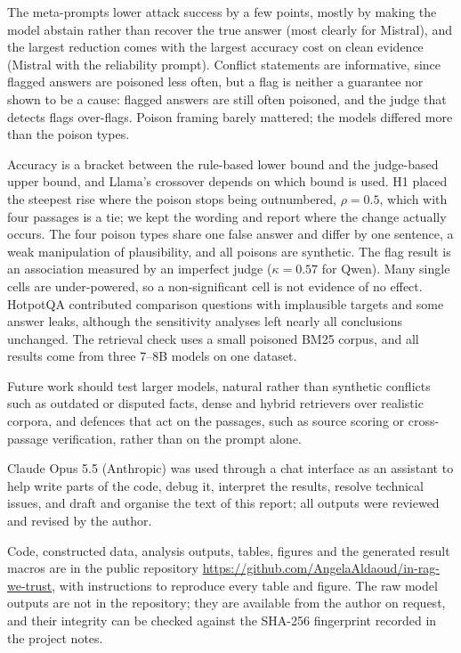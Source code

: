 \documentclass[pdflatex,sn-mathphys-ay]{sn-jnl}
\begin{document}
The meta-prompts lower
attack success by a few points, mostly by making the model abstain rather than recover the true answer (most clearly for Mistral), and the largest reduction comes with the largest
accuracy cost on clean evidence (Mistral with the reliability prompt). Conflict statements are informative,
since flagged answers are poisoned less often, but a flag is neither a
guarantee nor shown to be a cause: flagged answers are still often poisoned,
and the judge that detects flags over-flags. Poison framing barely mattered;
the models differed more than the poison types.

Accuracy is a bracket between
the rule-based lower bound and the judge-based upper bound, and Llama's
crossover depends on which bound is used. H1 placed the steepest rise where the poison stops being outnumbered, $\rho=0.5$, which with four passages is a tie; we kept the wording and report
where the change actually occurs. The four poison types share one false answer
and differ by one sentence, a weak manipulation of plausibility, and all
poisons are synthetic. The flag result is an association measured by an
imperfect judge ($\kappa=0.57$ for Qwen). Many single cells are under-powered,
so a non-significant cell is not evidence of no effect. HotpotQA contributed
comparison questions with implausible targets and some answer leaks, although
the sensitivity analyses left nearly all conclusions unchanged. The retrieval
check uses a small poisoned BM25 corpus, and all results come from three
7--8B models on one dataset.

Future work should test larger models, natural rather than synthetic conflicts
such as outdated or disputed facts, dense and hybrid retrievers over realistic
corpora, and defences that act on the passages, such as source scoring or
cross-passage verification, rather than on the prompt alone.

\backmatter

Claude Opus 5.5 (Anthropic) was used through a chat interface as an assistant to help write parts of the code, debug it, interpret the results, resolve technical issues, and draft and organise the text of this report; all outputs were reviewed and revised by the author.

Code, constructed data, analysis outputs, tables, figures and the generated
result macros are in the public repository \url{https://github.com/AngelaAldaoud/in-rag-we-trust}, with
instructions to reproduce every table and figure.
The raw model outputs are not in the repository; they are available from the author on request, and their integrity can be checked against the SHA-256 fingerprint recorded in the project notes.


\end{document}
